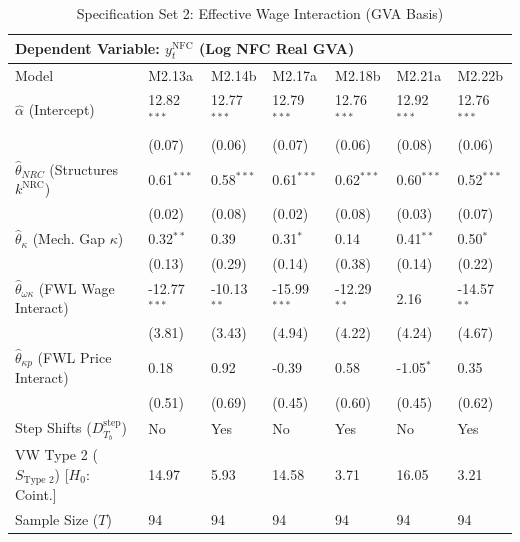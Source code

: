 \begin{table}[H]
\centering
\setlength{\tabcolsep}{2.5pt}
\caption{Specification Set 2: Effective Wage Interaction (GVA Basis)}
\label{tab:specB_set2_gva_core}
\scriptsize
\begin{tabular}{p{3.8cm}p{1.1cm}p{1.1cm}p{1.1cm}p{1.1cm}p{1.1cm}p{1.1cm}}
\toprule
\multicolumn{7}{l}{\textbf{Dependent Variable: $y_t^{\text{NFC}}$ (Log NFC Real GVA)}} \\
\midrule
Model & M2.13a & M2.14b & M2.17a & M2.18b & M2.21a & M2.22b \\
\midrule
$\hat{\alpha}$ (Intercept) & 12.82$^{***}$ & 12.77$^{***}$ & 12.79$^{***}$ & 12.76$^{***}$ & 12.92$^{***}$ & 12.76$^{***}$ \\
 & (0.07) & (0.06) & (0.07) & (0.06) & (0.08) & (0.06) \\
$\hat{\theta}_{NRC}$ (Structures $k^{\text{NRC}}$) & 0.61$^{***}$ & 0.58$^{***}$ & 0.61$^{***}$ & 0.62$^{***}$ & 0.60$^{***}$ & 0.52$^{***}$ \\
 & (0.02) & (0.08) & (0.02) & (0.08) & (0.03) & (0.07) \\
$\hat{\theta}_{\kappa}$ (Mech. Gap $\kappa$) & 0.32$^{**}$ & 0.39 & 0.31$^{*}$ & 0.14 & 0.41$^{**}$ & 0.50$^{*}$ \\
 & (0.13) & (0.29) & (0.14) & (0.38) & (0.14) & (0.22) \\
$\hat{\theta}_{\omega\kappa}$ (FWL Wage Interact) & -12.77$^{***}$ & -10.13$^{**}$ & -15.99$^{***}$ & -12.29$^{**}$ & 2.16 & -14.57$^{**}$ \\
 & (3.81) & (3.43) & (4.94) & (4.22) & (4.24) & (4.67) \\
$\hat{\theta}_{\kappa p}$ (FWL Price Interact) & 0.18 & 0.92 & -0.39 & 0.58 & -1.05$^{*}$ & 0.35 \\
 & (0.51) & (0.69) & (0.45) & (0.60) & (0.45) & (0.62) \\
Step Shifts ($D_{T_b}^{\text{step}}$) & No & Yes & No & Yes & No & Yes \\
\midrule
VW Type 2 ($S_{\text{Type 2}}$) [$H_0$: Coint.] & 14.97 & 5.93 & 14.58 & 3.71 & 16.05 & 3.21 \\
\midrule
Sample Size ($T$) & 94 & 94 & 94 & 94 & 94 & 94 \\
\bottomrule

\end{tabular}
\end{table}
